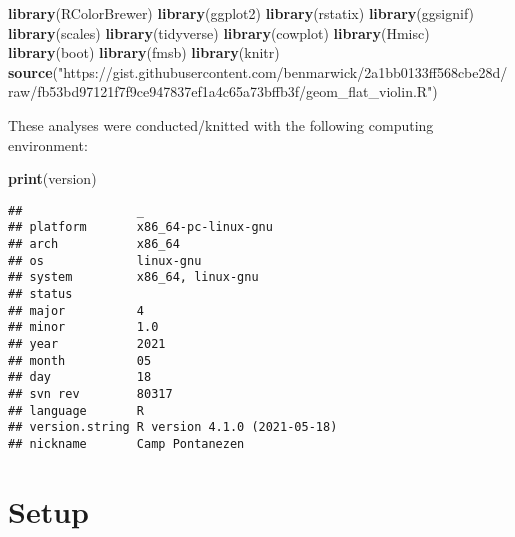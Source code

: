 \documentclass[]{book}
\newenvironment{Shaded}{\begin{snugshade}}{\end{snugshade}}
\newcommand{\KeywordTok}[1]{\textcolor[rgb]{0.13,0.29,0.53}{\textbf{#1}}}
\newcommand{\NormalTok}[1]{#1}
\newcommand{\StringTok}[1]{\textcolor[rgb]{0.31,0.60,0.02}{#1}}
\begin{document}
\begin{Shaded}
\begin{Highlighting}[]
\KeywordTok{library}\NormalTok{(RColorBrewer)}
\KeywordTok{library}\NormalTok{(ggplot2)}
\KeywordTok{library}\NormalTok{(rstatix)}
\KeywordTok{library}\NormalTok{(ggsignif)}
\KeywordTok{library}\NormalTok{(scales)}
\KeywordTok{library}\NormalTok{(tidyverse)}
\KeywordTok{library}\NormalTok{(cowplot)}
\KeywordTok{library}\NormalTok{(Hmisc)}
\KeywordTok{library}\NormalTok{(boot)}
\KeywordTok{library}\NormalTok{(fmsb)}
\KeywordTok{library}\NormalTok{(knitr)}
\KeywordTok{source}\NormalTok{(}\StringTok{"https://gist.githubusercontent.com/benmarwick/2a1bb0133ff568cbe28d/raw/fb53bd97121f7f9ce947837ef1a4c65a73bffb3f/geom_flat_violin.R"}\NormalTok{)}
\end{Highlighting}
\end{Shaded}

These analyses were conducted/knitted with the following computing environment:

\begin{Shaded}
\begin{Highlighting}[]
\KeywordTok{print}\NormalTok{(version)}
\end{Highlighting}
\end{Shaded}

\begin{verbatim}
##                _                           
## platform       x86_64-pc-linux-gnu         
## arch           x86_64                      
## os             linux-gnu                   
## system         x86_64, linux-gnu           
## status                                     
## major          4                           
## minor          1.0                         
## year           2021                        
## month          05                          
## day            18                          
## svn rev        80317                       
## language       R                           
## version.string R version 4.1.0 (2021-05-18)
## nickname       Camp Pontanezen
\end{verbatim}

\hypertarget{setup-3}{%
\section{Setup}\label{setup-3}}
\end{document}
